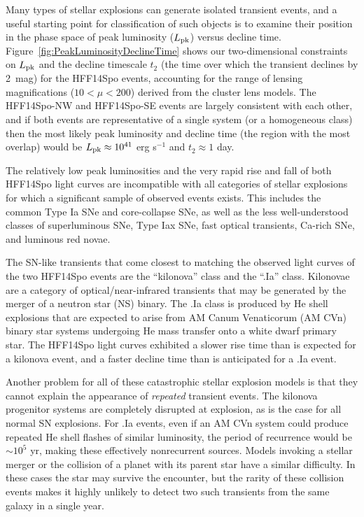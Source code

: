 \documentclass{article}
\providecommand\citep{\cite}
\def\spock{HFF14Spo\xspace}
\def\spockone{HFF14Spo-NW\xspace}
\def\spocktwo{HFF14Spo-SE\xspace}
\def\Lpk{\ensuremath{L_{\rm pk}}\xspace}
\def\t2{\ensuremath{t_{2}}\xspace}
\begin{document}
Many types of stellar explosions can generate isolated transient
events, and a useful starting point for classification of such objects
is to examine their position in the phase space of peak luminosity
(\Lpk) versus decline time\cite{Kulkarni:2007}.
Figure~\ref{fig:PeakLuminosityDeclineTime} shows our two-dimensional
constraints on \Lpk and the decline timescale \t2 (the time over which
the transient declines by 2~mag) for the \spock events,
accounting for the range of lensing magnifications ($10<\mu<200$)
derived from the cluster lens models.  The \spockone and \spocktwo
events are largely consistent with each other, and if both events are
representative of a single system (or a homogeneous class) then the
most likely peak luminosity and decline time (the region with the most
overlap) would be $L_{\rm pk}\approx10^{41}$ erg s$^{-1}$ and $t_2\approx1$
day.

The relatively low peak luminosities and the very rapid rise and fall
of both \spock light curves are incompatible with all categories of
stellar explosions for which a significant sample of observed events
exists.  This includes the common Type Ia SNe and core-collapse SNe,
as well as the less well-understood classes of superluminous
SNe\cite{Gal-Yam:2012}, Type Iax SNe\citep{Foley:2013a}, fast optical
transients\cite{Drout:2014}, Ca-rich SNe\cite{Kasliwal:2012}, and
luminous red novae\cite{Kulkarni:2007}.  

The SN-like transients that come closest to matching the observed
light curves of the two \spock events are the ``kilonova'' class and
the ``.Ia'' class.  Kilonovae are a category of optical/near-infrared
transients that may be generated by the merger of a neutron star (NS)
binary\cite{Li:1998, Tanvir:2013, Jin:2016}.  The .Ia class is
produced by He shell explosions that are expected to arise from AM
Canum Venaticorum (AM CVn) binary star systems undergoing He mass
transfer onto a white dwarf primary star\cite{Bildsten:2007}.  The
\spock light curves exhibited a slower rise time than is expected for
a kilonova event\cite{Barnes:2013, Kasen:2015}, and a faster decline
time than is anticipated for a .Ia event\cite{Shen:2010}.

Another problem for all of these catastrophic stellar explosion models
is that they cannot explain the appearance of {\it repeated} transient
events.  The kilonova progenitor systems are completely disrupted at
explosion, as is the case for all normal SN explosions.  For .Ia
events, even if an AM CVn system could produce repeated He shell
flashes of similar luminosity, the period of recurrence would be
$\sim10^5$ yr, making these effectively nonrecurrent sources.  Models
invoking a stellar merger or the collision of a planet with its parent
star have a similar difficulty.  In these cases the star may survive
the encounter, but the rarity of these collision events makes it
highly unlikely to detect two such transients from the same galaxy in
a single year.
\end{document}
